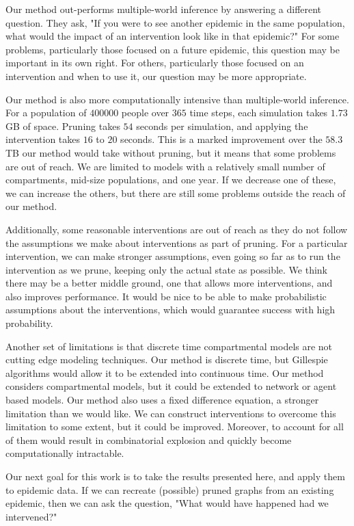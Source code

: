 \documentclass[openacc]{rsproca_new}%
\begin{document}
Our method out-performs multiple-world inference by answering a different question.
They ask, "If you were to see another epidemic in the same population, what would the impact of an intervention look like in that epidemic?"
For some problems, particularly those focused on a future epidemic, this question may be important in its own right.
For others, particularly those focused on an intervention and when to use it, our question may be more appropriate.

Our method is also more computationally intensive than multiple-world inference.
For a population of $400000$ people over $365$ time steps, each simulation takes $1.73$ GB of space.
Pruning takes $54$ seconds per simulation, and applying the intervention takes $16$ to $20$ seconds.
This is a marked improvement over the $58.3$ TB our method would take without pruning, but it means that some problems are out of reach.
We are limited to models with a relatively small number of compartments, mid-size populations, and one year.
If we decrease one of these, we can increase the others, but there are still some problems outside the reach of our method.

Additionally, some reasonable interventions are out of reach as they do not follow the assumptions we make about interventions as part of pruning.
For a particular intervention, we can make stronger assumptions, even going so far as to run the intervention as we prune, keeping only the actual state as possible.
We think there may be a better middle ground, one that allows more interventions, and also improves performance.
It would be nice to be able to make probabilistic assumptions about the interventions, which would guarantee success with high probability.

Another set of limitations is that discrete time compartmental models are not cutting edge modeling techniques.
Our method is discrete time, but Gillespie algorithms would allow it to be extended into continuous time.
Our method considers compartmental models, but it could be extended to network or agent based models.
Our method also uses a fixed difference equation, a stronger limitation than we would like.
We can construct interventions to overcome this limitation to some extent, but it could be improved.
Moreover, to account for all of them would result in  combinatorial explosion and quickly become computationally intractable. %

Our next goal for this work is to take the results presented here, and apply them to epidemic data.
If we can recreate (possible) pruned graphs from an existing epidemic, then we can ask the question, "What would have happened had we intervened?"
\end{document}
